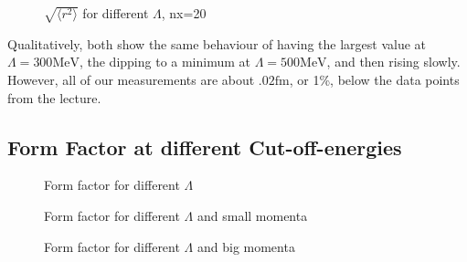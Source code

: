 \documentclass{scrartcl}
\begin{document}
\begin{figure}[htbp]
	
	\caption{$\sqrt{\langle r^2\rangle}$ for different $\Lambda$, nx=20}
	\label{fig:radius}
\end{figure}

Qualitatively, both show the same behaviour of having the largest value at $\Lambda=300\si{\mega\electronvolt}$, the dipping to a minimum at $\Lambda=500\si{\mega\electronvolt}$, and then rising slowly. However, all of our measurements are about $.02\si{\femto\meter}$, or 1\%, below the data points from the lecture.

\subsection{Form Factor at different Cut-off-energies}

\begin{figure}[htbp]
	
	\caption{Form factor for different $\Lambda$}
	\label{fig:formfactor}
\end{figure}

\begin{figure}[htbp]
	
	\caption{Form factor for different $\Lambda$ and small momenta}
	\label{fig:formfactorsmall}
\end{figure}

\begin{figure}[htbp]
	
	\caption{Form factor for different $\Lambda$ and big momenta}
	\label{fig:formfactorbig}
\end{figure}

\newpage
\listoffigures
\listoftables
\printbibliography
\end{document}
